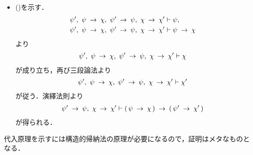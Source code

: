 \begin{sketch}
\begin{itemize}
			\item ()を示す．
				\begin{align}
					\psi',\ \psi \rarrow \chi,\ \psi' \rarrow \psi,\ \chi \rarrow \chi' &\vdash \psi, \\
					\psi',\ \psi \rarrow \chi,\ \psi' \rarrow \psi,\ \chi \rarrow \chi' &\vdash \psi \rarrow \chi
				\end{align}
				より
				\begin{align}
					\psi',\ \psi \rarrow \chi,\ \psi' \rarrow \psi,\ \chi \rarrow \chi' \vdash \chi
				\end{align}
				が成り立ち，再び三段論法より
				\begin{align}
					\psi',\ \psi \rarrow \chi,\ \psi' \rarrow \psi,\ \chi \rarrow \chi' \vdash \chi'
				\end{align}
				が従う．演繹法則より
				\begin{align}
					\psi' \hspace{0.25em}\rightarrow\hspace{0.25em} \psi,\ \chi \hspace{0.25em}\rightarrow\hspace{0.25em} \chi' \vdash
					(\, \psi \hspace{0.25em}\rightarrow\hspace{0.25em} \chi\, ) \hspace{0.25em}\rightarrow\hspace{0.25em} (\, \psi' \hspace{0.25em}\rightarrow\hspace{0.25em} \chi'\, )
				\end{align}
				が得られる．
				\QED
		\end{itemize}
	\end{sketch}
	
	代入原理を示すには構造的帰納法の原理が必要になるので，証明はメタなものとなる．
	
	\begin{comment}
	
	この原理の証明は相等性公理に負うところが多いが，
	本稿では$\varepsilon$項という厄介なものを抱え込んでいるため
	$\EQAX$だけでは不十分であり，次に追加する公理が必要になる．
	
	\begin{screen}
		\begin{axm}[$\varepsilon$項に対する相等性公理]
			$a,b$を類とし，$\varphi$を$\lang{\varepsilon}$の式とし，$\varphi$には変項$x,y$が
			自由に現れ，また$\varphi$に自由に現れる変項はこれらのみであるとする．このとき
			\begin{align}
				\EQAXEP \defarrow
				a = b \rarrow \varepsilon x \varphi(x,a) = \varepsilon x \varphi(x,b).
			\end{align}
		\end{axm}
	\end{screen}
	
	\end{comment}
	
